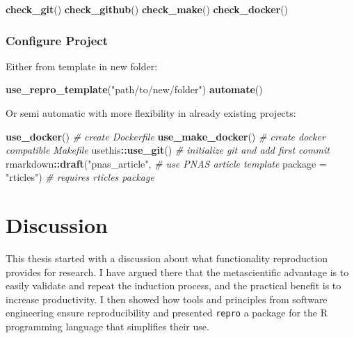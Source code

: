 \documentclass[12pt,a4paper,twoside]{article}
\newenvironment{Shaded}{\begin{snugshade}}{\end{snugshade}}
\newcommand{\CommentTok}[1]{\textcolor[rgb]{0.56,0.35,0.01}{\textit{#1}}}
\newcommand{\DataTypeTok}[1]{\textcolor[rgb]{0.13,0.29,0.53}{#1}}
\newcommand{\KeywordTok}[1]{\textcolor[rgb]{0.13,0.29,0.53}{\textbf{#1}}}
\newcommand{\NormalTok}[1]{#1}
\newcommand{\OperatorTok}[1]{\textcolor[rgb]{0.81,0.36,0.00}{\textbf{#1}}}
\newcommand{\StringTok}[1]{\textcolor[rgb]{0.31,0.60,0.02}{#1}}
\begin{document}
\begin{Shaded}
\begin{Highlighting}[]
\KeywordTok{check_git}\NormalTok{()}
\KeywordTok{check_github}\NormalTok{()}
\KeywordTok{check_make}\NormalTok{()}
\KeywordTok{check_docker}\NormalTok{()}
\end{Highlighting}
\end{Shaded}

\hypertarget{configure-project}{%
\subsubsection{Configure Project}\label{configure-project}}

Either from template in new folder:

\begin{Shaded}
\begin{Highlighting}[]
\KeywordTok{use_repro_template}\NormalTok{(}\StringTok{"path/to/new/folder"}\NormalTok{)}
\KeywordTok{automate}\NormalTok{()}
\end{Highlighting}
\end{Shaded}

Or semi automatic with more flexibility in already existing projects:

\begin{Shaded}
\begin{Highlighting}[]
\KeywordTok{use_docker}\NormalTok{() }\CommentTok{# create Dockerfile}
\KeywordTok{use_make_docker}\NormalTok{() }\CommentTok{# create docker compatible Makefile}
\NormalTok{usethis}\OperatorTok{::}\KeywordTok{use_git}\NormalTok{() }\CommentTok{# initialize git and add first commit}
\NormalTok{rmarkdown}\OperatorTok{::}\KeywordTok{draft}\NormalTok{(}\StringTok{"pnas_article"}\NormalTok{, }\CommentTok{# use PNAS article template}
                 \DataTypeTok{package =} \StringTok{"rticles"}\NormalTok{) }\CommentTok{# requires rticles package}
\end{Highlighting}
\end{Shaded}

\hypertarget{discussion}{%
\section{Discussion}\label{discussion}}

This thesis started with a discussion about what functionality reproduction provides for research.
I have argued there that the metascientific advantage is to easily validate and repeat the induction process, and the practical benefit is to increase productivity.
I then showed how tools and principles from software engineering ensure reproducibility and presented \texttt{repro} a package for the R programming language that simplifies their use.
\end{document}
